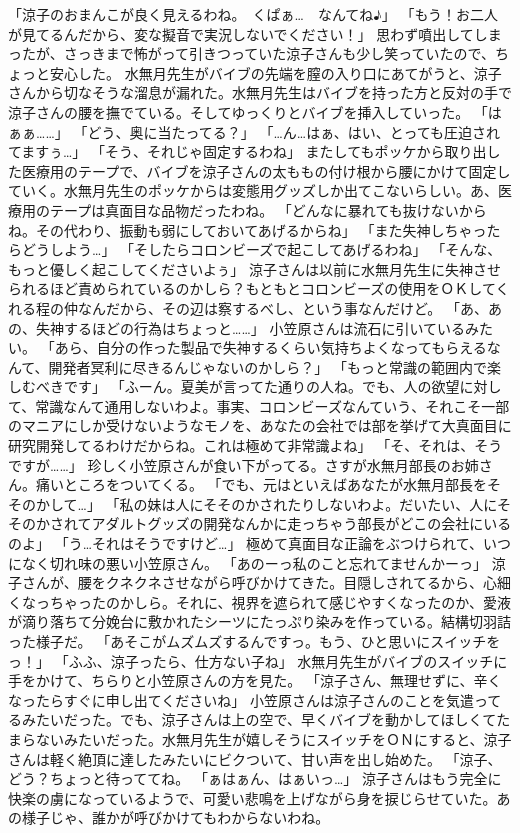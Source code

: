 「涼子のおまんこが良く見えるわね。　くぱぁ…　なんてね♪」
「もう！お二人が見てるんだから、変な擬音で実況しないでください！」
思わず噴出してしまったが、さっきまで怖がって引きつっていた涼子さんも少し笑っていたので、ちょっと安心した。
水無月先生がバイブの先端を膣の入り口にあてがうと、涼子さんから切なそうな溜息が漏れた。水無月先生はバイブを持った方と反対の手で涼子さんの腰を撫でている。そしてゆっくりとバイブを挿入していった。
「はぁぁ……」
「どう、奥に当たってる？」
「…ん…はぁ、はい、とっても圧迫されてますぅ…」
「そう、それじゃ固定するわね」
またしてもポッケから取り出した医療用のテープで、バイブを涼子さんの太ももの付け根から腰にかけて固定していく。水無月先生のポッケからは変態用グッズしか出てこないらしい。あ、医療用のテープは真面目な品物だったわね。
「どんなに暴れても抜けないからね。その代わり、振動も弱にしておいてあげるからね」
「また失神しちゃったらどうしよう…」
「そしたらコロンビーズで起こしてあげるわね」
「そんな、もっと優しく起こしてくださいよぅ」
涼子さんは以前に水無月先生に失神させられるほど責められているのかしら？もともとコロンビーズの使用をＯＫしてくれる程の仲なんだから、その辺は察するべし、という事なんだけど。
「あ、あの、失神するほどの行為はちょっと……」
小笠原さんは流石に引いているみたい。
「あら、自分の作った製品で失神するくらい気持ちよくなってもらえるなんて、開発者冥利に尽きるんじゃないのかしら？」
「もっと常識の範囲内で楽しむべきです」
「ふーん。夏美が言ってた通りの人ね。でも、人の欲望に対して、常識なんて通用しないわよ。事実、コロンビーズなんていう、それこそ一部のマニアにしか受けないようなモノを、あなたの会社では部を挙げて大真面目に研究開発してるわけだからね。これは極めて非常識よね」
「そ、それは、そうですが……」
珍しく小笠原さんが食い下がってる。さすが水無月部長のお姉さん。痛いところをついてくる。
「でも、元はといえばあなたが水無月部長をそそのかして…」
「私の妹は人にそそのかされたりしないわよ。だいたい、人にそそのかされてアダルトグッズの開発なんかに走っちゃう部長がどこの会社にいるのよ」
「う…それはそうですけど…」
極めて真面目な正論をぶつけられて、いつになく切れ味の悪い小笠原さん。
「あのーっ私のこと忘れてませんかーっ」
涼子さんが、腰をクネクネさせながら呼びかけてきた。目隠しされてるから、心細くなっちゃったのかしら。それに、視界を遮られて感じやすくなったのか、愛液が滴り落ちて分娩台に敷かれたシーツにたっぷり染みを作っている。結構切羽詰った様子だ。
「あそこがムズムズするんですっ。もう、ひと思いにスイッチをっ！」
「ふふ、涼子ったら、仕方ない子ね」
水無月先生がバイブのスイッチに手をかけて、ちらりと小笠原さんの方を見た。
「涼子さん、無理せずに、辛くなったらすぐに申し出てくださいね」
小笠原さんは涼子さんのことを気遣ってるみたいだった。でも、涼子さんは上の空で、早くバイブを動かしてほしくてたまらないみたいだった。水無月先生が嬉しそうにスイッチをＯＮにすると、涼子さんは軽く絶頂に達したみたいにビクついて、甘い声を出し始めた。
「涼子、どう？ちょっと待っててね。
「ぁはぁん、はぁいっ…」
涼子さんはもう完全に快楽の虜になっているようで、可愛い悲鳴を上げながら身を捩じらせていた。あの様子じゃ、誰かが呼びかけてもわからないわね。



